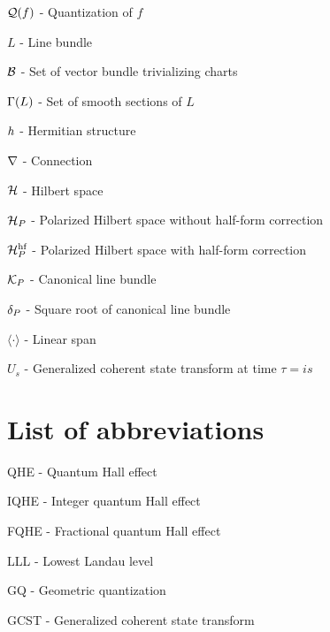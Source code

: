 \documentclass[notas.tex]{subfiles}
\begin{document}
	$\mathcal{Q}(f)$ - Quantization of $f$
	
	$L$ - Line bundle

	$\mathcal{B}$ - Set of vector bundle trivializing charts

	$\Gamma(L)$ - Set of smooth sections of $L$

	$h$ - Hermitian structure

	$\nabla$ - Connection

	$\mathcal{H}$ - Hilbert space

	$\mathcal{H}_P$ - Polarized Hilbert space without half-form correction

	$\mathcal{H}_P^\text{hf}$ - Polarized Hilbert space with half-form correction

	$\mathcal{K}_P$ - Canonical line bundle

	$\delta_P$ - Square root of canonical line bundle

	$\langle \cdot \rangle$ - Linear span

	$U_s$ - Generalized coherent state transform at time $\tau = is$

	\chapter*{List of abbreviations}
	QHE - Quantum Hall effect

	IQHE - Integer quantum Hall effect

	FQHE - Fractional quantum Hall effect

	LLL - Lowest Landau level

	GQ - Geometric quantization
	
	GCST - Generalized coherent state transform
\end{document}
